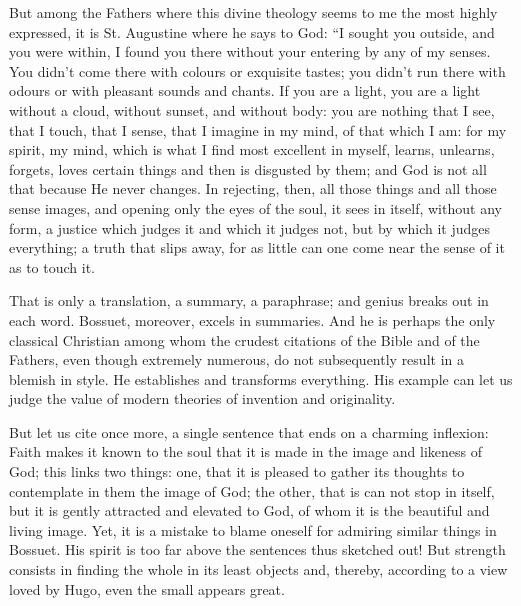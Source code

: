 \begin{quotex}
But among the Fathers where this divine theology seems to me the most highly expressed, it is St. Augustine where he says to God: “I sought you outside, and you were within, I found you there without your entering by any of my senses. You didn’t come there with colours or exquisite tastes; you didn’t run there with odours or with pleasant sounds and chants. If you are a light, you are a light without a cloud, without sunset, and without body: you are nothing that I see, that I touch, that I sense, that I imagine in my mind, of that which I am: for my spirit, my mind, which is what I find most excellent in myself, learns, unlearns, forgets, loves certain things and then is disgusted by them; and God is not all that because He never changes. In rejecting, then, all those things and all those sense images, and opening only the eyes of the soul, it sees in itself, without any form, a justice which judges it and which it judges not, but by which it judges everything; a truth that slips away, for as little can one come near the sense of it as to touch it.
\end{quotex}

That is only a translation, a summary, a paraphrase; and genius breaks out in each word. Bossuet, moreover, excels in summaries. And he is perhaps the only classical Christian among whom the crudest citations of the Bible and of the Fathers, even though extremely numerous, do not subsequently result in a blemish in style. He establishes and transforms everything. His example can let us judge the value of modern theories of invention and originality.

But let us cite once more, a single sentence that ends on a charming inflexion: Faith makes it known to the soul that it is made in the image and likeness of God; this links two things: one, that it is pleased to gather its thoughts to contemplate in them the image of God; the other, that is can not stop in itself, but it is gently attracted and elevated to God, of whom it is the beautiful and living image. Yet, it is a mistake to blame oneself for admiring similar things in Bossuet. His spirit is too far above the sentences thus sketched out! But strength consists in finding the whole in its least objects and, thereby, according to a view loved by Hugo, even the small appears great.


